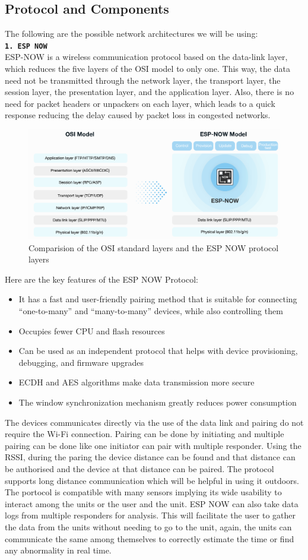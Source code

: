 \subsection{Protocol and Components}
The following are the possible network architectures we will be using: \\
\textbf{\texttt{1. ESP NOW}} \\
ESP-NOW is a wireless communication protocol based on the data-link layer, which reduces the five layers of the OSI model to only one. This way, the data need not be transmitted through the network layer, the transport layer, the session layer, the presentation layer, and the application layer. Also, there is no need for packet headers or unpackers on each layer, which leads to a quick response reducing the delay caused by packet loss in congested networks. 
\begin{figure}[H]
    \centering
    \includegraphics[width=0.75\linewidth]{Files/Images/model-en.png}
    \caption{Comparision of the OSI standard layers and the ESP NOW protocol layers}
    \label{fig:enter-label}
\end{figure}
Here are the key features of the ESP NOW Protocol:
\begin{itemize}
    \item It has a fast and user-friendly pairing method that is suitable for connecting “one-to-many” and “many-to-many” devices, while also controlling them
    \item Occupies fewer CPU and flash resources
    \item Can be used as an independent protocol that helps with device provisioning, debugging, and firmware upgrades
    \item  ECDH and AES algorithms make data transmission more secure
    \item The window synchronization mechanism greatly reduces power consumption
\end{itemize}
The devices communicates directly via the use of the data link and pairing do not require the Wi-Fi connection. Pairing can be done by initiating and multiple pairing can be done like one initiator can pair with multiple responder. Using the RSSI, during the paring the device distance can be found and that distance can be authorised and the device at that distance can be paired. The protocol supports long distance communication which will be helpful in using it outdoors. The portocol is compatible with many sensors implying its wide usability to interact among the units or the user and the unit. ESP NOW can also take data logs from multiple responders for analysis. This will facilitate the user to gather the data from the units without needing to go to the unit, again, the units can communicate the same among themselves to correctly estimate the time or find any abnormality in real time. 